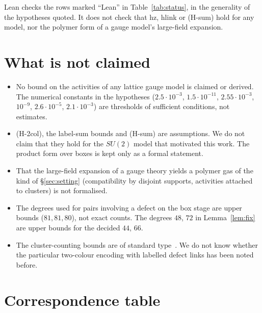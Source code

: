 \documentclass[11pt,a4paper]{article}
\theoremstyle{definition}
\theoremstyle{remark}
\DeclareRobustCommand{\lean}[1]{{\ttfamily\renewcommand{\_}{\textunderscore\allowbreak}#1}}
\begin{document}
Lean checks the rows marked ``Lean'' in Table~\ref{tab:status}, in the generality of the hypotheses quoted. It does not check that \lean{hz}, \lean{hlink} or (H-sum) hold for any model, nor the polymer form of a gauge model's large-field expansion.

\section{What is not claimed}\label{sec:notclaimed}
\begin{itemize}[leftmargin=2em]
\item No bound on the activities of any lattice gauge model is claimed or derived. The numerical constants in the hypotheses ($2.5\cdot10^{-3}$, $1.5\cdot10^{-11}$, $2.55\cdot10^{-3}$, $10^{-9}$, $2.6\cdot10^{-5}$, $2.1\cdot10^{-3}$) are thresholds of sufficient conditions, not estimates.
\item (H-2col), the label-sum bounds and (H-sum) are assumptions. We do not claim that they hold for the $SU(2)$ model that motivated this work. The product form over boxes is kept only as a formal statement.
\item That the large-field expansion of a gauge theory yields a polymer gas of the kind of \S\ref{sec:setting} (compatibility by disjoint supports, activities attached to clusters) is not formalised.
\item The degrees used for pairs involving a defect on the box stage are upper bounds ($81,81,80$), not exact counts. The degrees $48$, $72$ in Lemma~\ref{lem:fix} are upper bounds for the decided $44$, $66$.
\item The cluster-counting bounds are of standard type~\cite{KP,Do,Ue}. We do not know whether the particular two-colour encoding with labelled defect links has been noted before.
\end{itemize}

\section{Correspondence table}\label{sec:corr}
\end{document}
